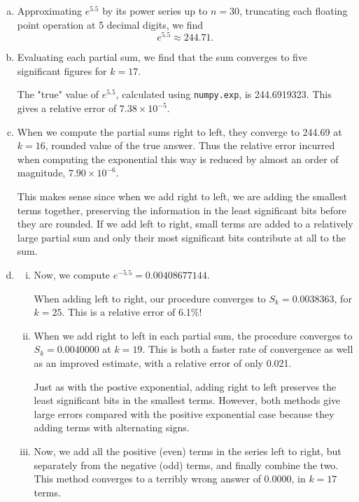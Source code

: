 \documentclass[12pt]{article}
\begin{document}
\begin{enumerate}[(a)]
\item
Approximating $e^{5.5}$ by its power series up to $n = 30$, truncating each floating point operation at 5 decimal digits, we find
\begin{equation*}
e^{5.5} \approx 244.71.
\end{equation*}

\item
Evaluating each partial sum, we find that the sum converges to five significant figures for $k = 17$. 

The "true" value of $e^{5.5}$, calculated using \texttt{numpy.exp}, is 244.6919323. This gives a relative error of $7.38\times10^{-5}$.

\item
When we compute the partial sums right to left, they converge to 244.69 at $k = 16$, rounded value of the true answer. Thus the relative error incurred when computing the exponential this way is reduced by almost an order of magnitude, $7.90\times10^{-6}$.

This makes sense since when we add right to left, we are adding the smallest terms together, preserving the information in the least significant bits before they are rounded. If we add left to right, small terms are added to a relatively large partial sum and only their most significant bits contribute at all to the sum.

\item
	\begin{enumerate}[(i)]
	\item
	Now, we compute $e^{-5.5} = 0.00408677144$.

	When adding left to right, our procedure converges to $S_k = 0.0038363$, for $k = 25$. This is a relative error of 6.1\%!

	\item
	When we add right to left in each partial sum, the procedure converges to $S_k = 0.0040000$ at $k = 19$. This is both a faster rate of convergence as well as an improved estimate, with a relative error of only 0.021.

	Just as with the postive exponential, adding right to left preserves the least significant bits in the smallest terms. However, both methods give large errors compared with the positive exponential case because they adding terms with alternating signs.

	\item
	Now, we add all the positive (even) terms in the series left to right, but separately from the negative (odd) terms, and finally combine the two. This method converges to a terribly wrong answer of $0.0000$, in $k = 17$ terms.


\end{enumerate}
\end{enumerate}
\end{document}
